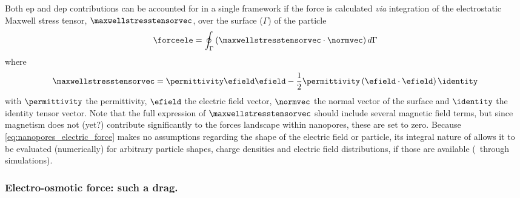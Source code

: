 Both \gls{ep} and \gls{dep} contributions can be accounted for in a single framework if the force is
calculated \textit{via} integration of the electrostatic Maxwell stress tensor, $\maxwellstresstensorvec$,
over the surface ($\Gamma$) of the particle~\cite{Ai-2011}
%
\begin{equation}\label{eq:nanopores_electric_force}
  \forceele = \oint_{\Gamma} \left( \maxwellstresstensorvec \cdot \normvec \right) d\Gamma
\end{equation}
%
where
%
\begin{equation}\label{eq:nanopores_maxwell_stresstensor}
  \maxwellstresstensorvec = \permittivity \efield \efield
                            - \dfrac{1}{2} \permittivity \left( \efield \cdot \efield \right) \identity
\end{equation}
%
with $\permittivity$ the permittivity, $\efield$ the electric field vector, $\normvec$ the normal vector of
the surface and $\identity$ the identity tensor vector. Note that the full expression of
$\maxwellstresstensorvec$ should include several magnetic field terms, but since magnetism does not (yet?)
contribute significantly to the forces landscape within nanopores, these are set to zero. Because
\cref{eq:nanopores_electric_force} makes no assumptions regarding the shape of the electric field or particle,
its integral nature of allows it to be evaluated (numerically) for arbitrary particle shapes, charge densities
and electric field distributions, if those are available (\eg~through simulations).


\subsubsection{Electro-osmotic force: such a drag.}
%

